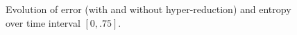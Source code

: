 \documentclass[preprint,10pt]{elsarticle}
\theoremstyle{definition}
\theoremstyle{lemma}
\theoremstyle{theorem}
\theoremstyle{assumption}
\begin{document}
\begin{figure}[!h]
\centering
{}
\hspace{2em}
\caption{Evolution of error (with and without hyper-reduction) and entropy over time interval $[0,.75]$.}
\label{fig:entropyevo}
\end{figure}
\end{document}
